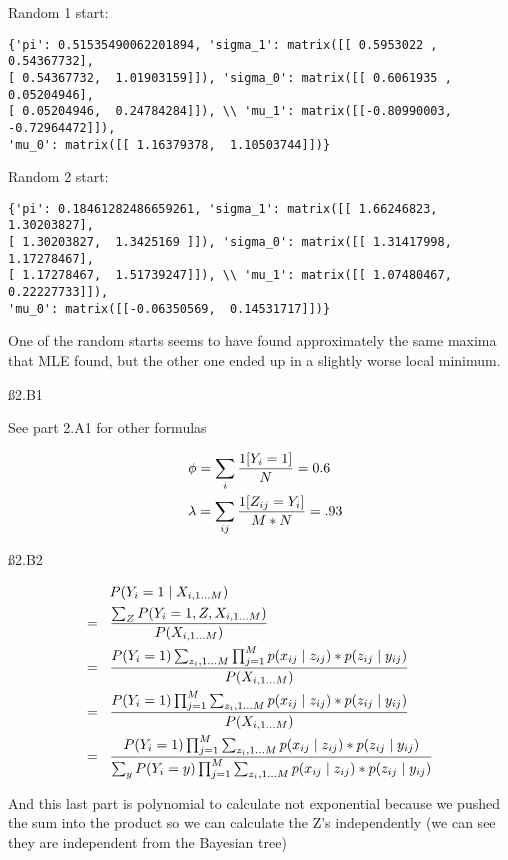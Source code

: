 Random 1 start:
\begin{verbatim}
{'pi': 0.51535490062201894, 'sigma_1': matrix([[ 0.5953022 ,  0.54367732],
[ 0.54367732,  1.01903159]]), 'sigma_0': matrix([[ 0.6061935 ,  0.05204946],
[ 0.05204946,  0.24784284]]), \\ 'mu_1': matrix([[-0.80990003, -0.72964472]]),
'mu_0': matrix([[ 1.16379378,  1.10503744]])}
\end{verbatim}

Random 2 start:
\begin{verbatim}
{'pi': 0.18461282486659261, 'sigma_1': matrix([[ 1.66246823,  1.30203827],
[ 1.30203827,  1.3425169 ]]), 'sigma_0': matrix([[ 1.31417998,  1.17278467],
[ 1.17278467,  1.51739247]]), \\ 'mu_1': matrix([[ 1.07480467,  0.22227733]]),
'mu_0': matrix([[-0.06350569,  0.14531717]])}
\end{verbatim}

One of the random starts seems to have found approximately the same maxima that MLE found, but the other one ended up in a slightly worse local minimum.

\ss{2.B1}

See part 2.A1 for other formulas

\begin{align*}
& \phi = \sum_{i}\frac{1[Y_{i}=1]}{N} = 0.6 \\ \hspace{3 mm} &
\lambda = \sum_{ij} \frac{1[Z_{ij}=Y_i]}{M*N} = .93
\end{align*}

\ss{2.B2}

\begin{align*}
& P(Y_i=1 \mid X_{i,1\dots M}) \\ = \hspace{3 mm} &
\frac{\sum_Z P(Y_i=1, Z, X_{i,1\dots M})}{P(X_{i,1\dots M})} \\ = \hspace{3 mm} &
\frac{P(Y_i=1) \sum_{z_i,1\dots M} \prod_{j=1}^M p(x_{ij} \mid z_{ij}) * p(z_{ij} \mid y_{ij})}{P(X_{i,1\dots M})} \\ = \hspace{3 mm} &
\frac{P(Y_i=1) \prod_{j=1}^M \sum_{z_i,1\dots M} p(x_{ij} \mid z_{ij}) * p(z_{ij} \mid y_{ij})}{P(X_{i,1\dots M})} \\ = \hspace{3 mm} &
\frac{P(Y_i=1) \prod_{j=1}^M \sum_{z_i,1\dots M} p(x_{ij} \mid z_{ij}) * p(z_{ij} \mid y_{ij})}{\sum_y P(Y_i=y) \prod_{j=1}^M \sum_{z_i,1\dots M} p(x_{ij} \mid z_{ij}) * p(z_{ij} \mid y_{ij})}
\end{align*}

And this last part is polynomial to calculate not exponential because we pushed the sum into the product so we can calculate the Z's independently (we can see they are independent from the Bayesian tree)

